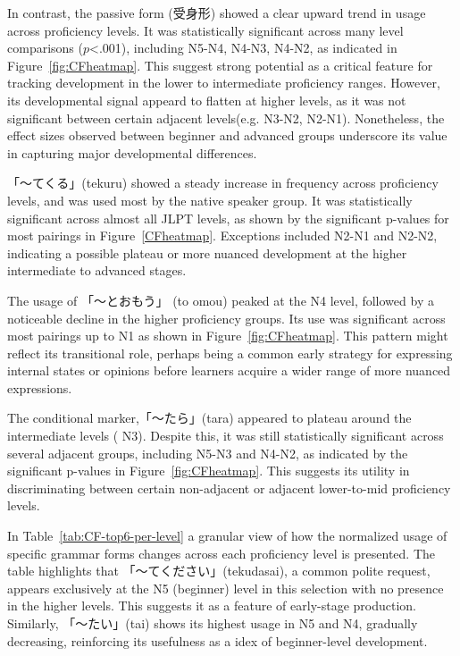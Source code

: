 In
contrast, the
passive form (受身形) showed a clear upward trend in usage across proficiency levels. It was statistically significant
across many level comparisons ($p$<.001), including N5-N4, N4-N3, N4-N2, as indicated in Figure~\ref{fig:CFheatmap}.
This suggest strong potential as a critical feature for tracking development in the lower to intermediate
proficiency ranges. However, its developmental signal appeard to flatten at higher levels, as it was not significant
between certain adjacent levels(e.g. N3-N2, N2-N1). Nonetheless, the effect sizes observed between beginner
and advanced groups underscore its value in capturing major developmental differences.

「〜てくる」(tekuru) showed a steady increase in frequency across proficiency levels, and was used most by the native speaker
group. It was
statistically significant across almost all JLPT levels, as shown by the significant p-values for most pairings in
Figure~\ref{CFheatmap}. Exceptions included N2-N1 and N2-N2, indicating a possible plateau or more nuanced
development at the higher intermediate to advanced stages.


The usage of 「〜とおもう」 (to omou) peaked at the N4 level, followed by a noticeable decline in the higher proficiency
groups. Its
use was
significant across most pairings up to N1 as shown in Figure~\ref{fig:CFheatmap}. This pattern might reflect its
transitional
role, perhaps being a common early strategy for expressing
internal states or
opinions before learners acquire a wider range of more nuanced expressions.

The conditional marker,「〜たら」(tara) appeared to plateau  around the intermediate levels (
N3). Despite this, it was still statistically significant across several adjacent groups, including N5-N3 and N4-N2,
as indicated by the significant p-values in Figure~\ref{fig:CFheatmap}. This suggests its utility in discriminating
between certain non-adjacent or adjacent lower-to-mid proficiency levels.

In Table~\ref{tab:CF-top6-per-level} a granular view of how the normalized usage of specific grammar forms changes
across each proficiency level is presented. The table highlights that 「〜てください」(tekudasai), a common polite request,
appears exclusively at the N5 (beginner) level in this selection with no presence in the higher levels. This
suggests it as a feature of early-stage production. Similarly, 「〜たい」(tai) shows its highest usage in N5 and N4,
gradually decreasing, reinforcing its usefulness as a idex of beginner-level development.

